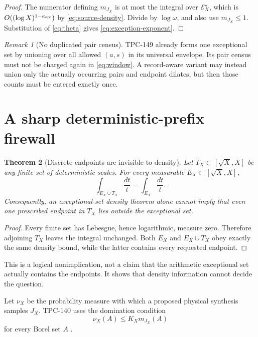 \documentclass[11pt]{article}
\newtheorem{theorem}{Theorem}[section]
\theoremstyle{definition}
\theoremstyle{remark}
\newtheorem{remark}[theorem]{Remark}
\begin{document}
\begin{proof}
The numerator defining \(m_{J_X}\) is at most the integral over
\(\mathcal E_X^\star\), which is
\(O((\log X)^{1-\kappa_{\rm src}})\) by
\eqref{eq:source-density}.  Divide by \(\log\omega\), and also use
\(m_{J_X}\le1\).  Substitution of \eqref{eq:theta} gives
\eqref{eq:exception-exponent}.
\end{proof}

\begin{remark}[No duplicated pair census]
TPC-149 already forms one exceptional set by unioning over all
allowed \((a,s)\) in its universal envelope.  Its pair census must
not be charged again in \eqref{eq:window}.  A record-aware variant
may instead union only the actually occurring pairs and endpoint
dilates, but then those counts must be entered exactly once.
\end{remark}

\section{A sharp deterministic-prefix firewall}

\begin{theorem}[Discrete endpoints are invisible to density]
\label{thm:atomic-set}
Let \(T_X\subset[\sqrt X,X]\) be any finite set of deterministic
scales.  For every measurable \(E_X\subset[\sqrt X,X]\),
\[
 \int_{E_X\cup T_X}\frac{dt}{t}
 =
 \int_{E_X}\frac{dt}{t}.
\]
Consequently, an exceptional-set density theorem alone cannot imply
that even one prescribed endpoint in \(T_X\) lies outside the
exceptional set.
\end{theorem}

\begin{proof}
Every finite set has Lebesgue, hence logarithmic, measure zero.
Therefore adjoining \(T_X\) leaves the integral unchanged.  Both
\(E_X\) and \(E_X\cup T_X\) obey exactly the same density bound, while
the latter contains every requested endpoint.
\end{proof}

This is a logical nonimplication, not a claim that the arithmetic
exceptional set actually contains the endpoints.  It shows that
density information cannot decide the question.

Let \(\nu_X\) be the probability measure with which a proposed
physical synthesis samples \(J_X\).  TPC-140 uses the domination
condition
\begin{equation}
 \nu_X(A)\le K_Xm_{J_X}(A)
\label{eq:selector}
\end{equation}
for every Borel set \(A\) \citep{WangTPC140}.
\end{document}
